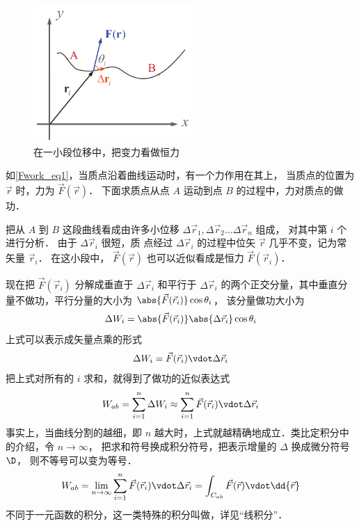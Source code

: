 

\begin{figure}[ht]
\centering
\includegraphics[width=6cm]{./figures/Fwork.pdf}
\caption{在一小段位移中，把变力看做恒力}\label{Fwork_eq1}
\end{figure}

如\autoref{Fwork_eq1}，当质点沿着曲线运动时，有一个力作用在其上， 当质点的位置为 $\vec r$ 时，力为 $\vec F(\vec r)$． 下面求质点从点 $A$ 运动到点 $B$ 的过程中，力对质点的做功．

把从 $A$ 到 $B$ 这段曲线看成由许多小位移 $\Delta \vec r_1, \Delta \vec r_2 \dots \Delta \vec r_n$ 组成， 对其中第 $i$ 个进行分析． 由于 $\Delta \vec r_i$ 很短，质
点经过 $\Delta \vec r_i$ 的过程中位矢 $\vec r$ 几乎不变，记为常矢量 $\vec r_i$． 在这小段中，  $\vec F(\vec r)$ 也可以近似看成是恒力 $\vec F(\vec r_i)$． 

现在把 $\vec F(\vec r_i)$ 分解成垂直于 $\Delta \vec r_i$ 和平行于 $\Delta \vec r_i$ 的两个正交分量，其中垂直分量不做功，平行分量的大小为 $ \abs{\vec F(\vec r_i)} \cos \theta_i$， 该分量做功大小为
\begin{equation}
\Delta W_i = \abs{\vec F(\vec r_i)} \abs{\Delta \vec r_i} \cos \theta_i
\end{equation}
上式可以表示成矢量点乘的形式
\begin{equation}\label{Fwork_eq2}
\Delta W_i = \vec F(\vec r_i) \vdot \Delta \vec r_i
\end{equation}
把上式对所有的 $i$ 求和，就得到了做功的近似表达式
\begin{equation}
W_{ab} = \sum_{i = 1}^n \Delta W_i  \approx \sum_{i = 1}^n \vec F(\vec r_i) \vdot \Delta \vec r_i 
\end{equation} 
事实上，当曲线分割的越细，即 $n$ 越大时，上式就越精确地成立．类比定积分中的介绍，令 $n \to \infty $， 把求和符号换成积分符号，把表示增量的 $\Delta $ 换成微分符号 $\D$， 则不等号可以变为等号．
\begin{equation}
W_{ab} = \lim_{n \to \infty } \sum_{i = 1}^n \vec F(\vec r_i) \vdot \Delta \vec r_i  = \int_{C_{ab}} \vec F(\vec r) \vdot \dd{\vec r}
\end{equation} 
不同于一元函数的积分，这一类特殊的积分叫做，详见“线积分”．

